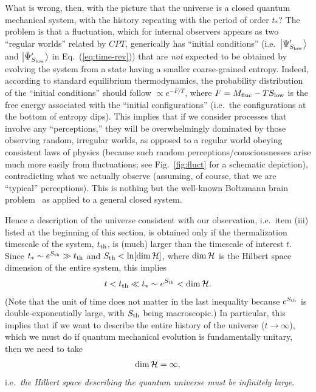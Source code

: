 \documentclass[12pt]{article}
\begin{document}
What is wrong, then, with the picture that the universe is a closed 
quantum mechanical system, with the history repeating with the period 
of order $t_*$?  The problem is that a fluctuation, which for internal 
observers appears as two ``regular worlds'' related by $CPT$, generically 
has ``initial conditions'' (i.e.\ $\bigl|\Psi'_{S_{\rm low}}\bigr>$ 
and $\bigl|\bar{\Psi}'_{S_{\rm low}}\bigr>$ in Eq.~(\ref{eq:time-rev})) 
that are {\it not} expected to be obtained by evolving the system from 
a state having a smaller coarse-grained entropy.  Indeed, according 
to standard equilibrium thermodynamics, the probability distribution 
of the ``initial conditions'' should follow $\propto e^{-F/T}$, where 
$F = M_{\rm fluc} - T S_{\rm low}$ is the free energy associated with 
the ``initial configurations'' (i.e.\ the configurations at the bottom 
of entropy dips).  This implies that if we consider processes that 
involve any ``perceptions,'' they will be overwhelmingly dominated 
by those observing random, irregular worlds, as opposed to a regular 
world obeying consistent laws of physics (because such random 
perceptions/consciousnesses arise much more easily from fluctuations; 
see Fig.~\ref{fig:fluct} for a schematic depiction), contradicting 
what we actually observe (assuming, of course, that we are ``typical'' 
perceptions).  This is nothing but the well-known Boltzmann brain 
problem~\cite{Page:2006dt} as applied to a general closed system.

Hence a description of the universe consistent with our observation, 
i.e.\ item (iii) listed at the beginning of this section, is obtained 
only if the thermalization timescale of the system, $t_{\rm th}$, is 
(much) larger than the timescale of interest $t$.  Since $t_* \sim 
e^{S_{\rm th}} \gg t_{\rm th}$ and $S_{\rm th} < \ln[{\rm dim}\,{\cal H}]$, 
where ${\rm dim}\,{\cal H}$ is the Hilbert space dimension of the entire 
system, this implies
%
\begin{equation}
  t < t_{\rm th} \ll t_* \sim e^{S_{\rm th}} < {\rm dim}\,{\cal H}.
\label{eq:large-Hilbert}
\end{equation}
%
(Note that the unit of time does not matter in the last inequality because 
$e^{S_{\rm th}}$ is double-exponentially large, with $S_{\rm th}$ being 
macroscopic.)  In particular, this implies that if we want to describe 
the entire history of the universe ($t \rightarrow \infty$), which we 
must do if quantum mechanical evolution is fundamentally unitary, then 
we need to take
%
\begin{equation}
  {\rm dim}\,{\cal H} = \infty,
\label{eq:Hilbert-inf}
\end{equation}
%
i.e.\ {\it the Hilbert space describing the quantum universe must 
be infinitely large}.
\end{document}
